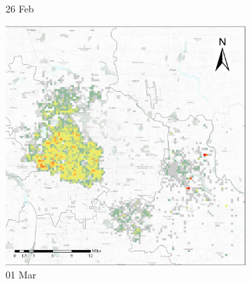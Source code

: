 \documentclass[preprints,ijgi,submit,moreauthors]{Definitions/mdpi}
\begin{document}
\begin{figure}[H]
\begin{subfigure}{.23\textwidth}
        \caption{26 Feb}
    \end{subfigure}
    \begin{subfigure}{.23\textwidth}
        \includegraphics[width=\textwidth]{Figures/Overall_spatial_patterns/FN5_D2020_03_01.eps}
        \caption{01 Mar}
    \end{subfigure}
    \begin{subfigure}{.13\textwidth}

\end{subfigure}
\end{figure}
\end{document}
